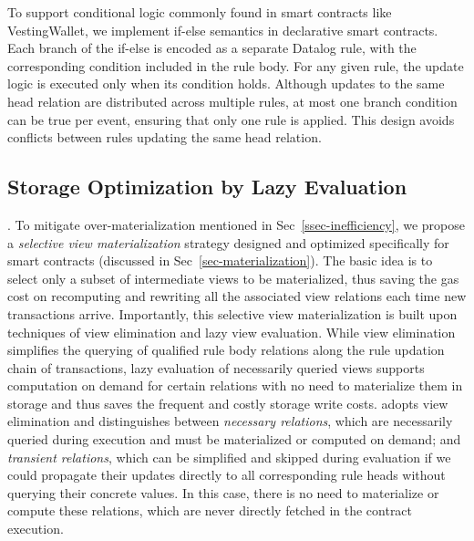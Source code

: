To support conditional logic commonly found in smart contracts like {\sf VestingWallet}, we implement {\sf if-else} semantics in declarative smart contracts. Each branch of the {\sf if-else} is encoded as a separate Datalog rule, with the corresponding condition included in the rule body.
For any given rule, the update logic is executed only when its condition holds. Although updates to the same head relation are distributed across multiple rules, at most one branch condition can be true per event, ensuring that only one rule is applied. This design avoids conflicts between rules updating the same head relation.

\subsection{Storage Optimization by Lazy Evaluation}
\label{ssec:lazy-evaluation}

.
To mitigate over-materialization mentioned in Sec~\ref{ssec-inefficiency}, we propose a {\em selective view materialization} strategy designed and optimized specifically for smart contracts (discussed in Sec~\ref{sec-materialization}).
The basic idea is to select only a subset of intermediate views to be materialized, thus saving the gas cost on recomputing and rewriting all the associated view relations each time new transactions arrive. Importantly, this selective view materialization is built upon techniques of view elimination and lazy view evaluation. 
While view elimination simplifies the querying of qualified rule body relations along the rule updation chain of transactions, lazy evaluation of necessarily queried views supports computation on demand for certain relations with no need to materialize them in storage and thus saves the frequent and costly storage write costs. 
\proto adopts view elimination and distinguishes between
\emph{necessary relations}, which are necessarily queried during execution and must be materialized or computed on demand; and
\emph{transient relations}, which can be simplified and skipped during evaluation if we could propagate their updates directly to all corresponding rule heads without querying their concrete values. In this case, there is no need to materialize or compute these relations, which are never directly fetched in the contract execution.

